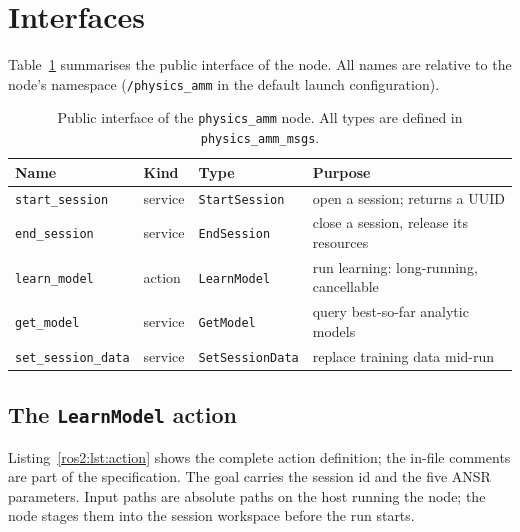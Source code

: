 \section{Interfaces}
\label{ros2:sec:interfaces}

Table~\ref{ros2:tab:interfaces} summarises the public interface of the node.
All names are relative to the node's namespace (\texttt{/physics\_amm} in the
default launch configuration).

\begin{table}[tb]
  \centering
  \caption{Public interface of the \texttt{physics\_amm} node. All types are
    defined in \texttt{physics\_amm\_msgs}.}
  \label{ros2:tab:interfaces}
  \footnotesize
  \begin{tabular}{@{}llll@{}}
    \toprule
    Name & Kind & Type & Purpose \\
    \midrule
    \texttt{start\_session}    & service & \texttt{StartSession}   & open a session; returns a UUID \\
    \texttt{end\_session}      & service & \texttt{EndSession}     & close a session, release its resources \\
    \texttt{learn\_model}      & action  & \texttt{LearnModel}     & run learning: long-running, cancellable \\
    \texttt{get\_model}        & service & \texttt{GetModel}       & query best-so-far analytic models \\
    \texttt{set\_session\_data}& service & \texttt{SetSessionData} & replace training data mid-run \\
    \bottomrule
  \end{tabular}
\end{table}

\subsection{The \texttt{LearnModel} action}
\label{ros2:sec:learnmodel}

Listing~\ref{ros2:lst:action} shows the complete action definition; the
in-file comments are part of the specification. The goal carries the session
id and the five ANSR parameters. Input paths are absolute paths on the host
running the node; the node stages them into the session workspace before the
run starts.

\begin{figure}[tb]

\end{figure}

